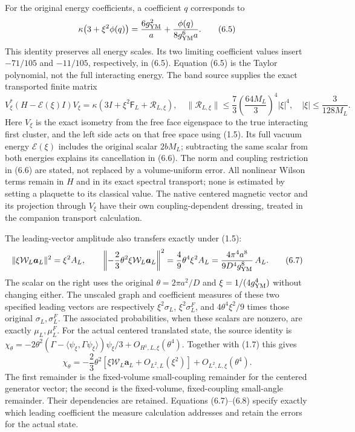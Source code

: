 \documentclass[
  11pt,
]{article}
\begin{document}
For the original energy coefficients, a coefficient \(q\) corresponds to
\[
\kappa\bigl(3+\xi^2\phi(q)\bigr)
 =\frac{6g_{\rm YM}^2}{a}
       +\frac{\phi(q)}{8g_{\rm YM}^6a}.
\tag{6.5}
\] This identity preserves all energy scales. Its two limiting
coefficient values insert \(-71/105\) and \(-11/105\), respectively, in
(6.5). Equation (6.5) is the Taylor polynomial, not the full interacting
energy. The band source supplies the exact transported finite matrix \[
V_\xi^*(H-\mathcal E(\xi)I)V_\xi
 =\kappa\left(3I+\xi^2\mathsf F_L+\mathcal R_{L,\xi}\right),
\quad
\|\mathcal R_{L,\xi}\|
 \le\frac73\left(\frac{64M_L}{3}\right)^4|\xi|^4,
\quad |\xi|\le\frac3{128M_L}.
\tag{6.6}
\] Here \(V_\xi\) is the exact isometry from the free face eigenspace to
the true interacting first cluster, and the left side acts on that free
space using (1.5). Its full vacuum energy \(\mathcal E(\xi)\) includes
the original scalar \(2bM_L\); subtracting the same scalar from both
energies explains its cancellation in (6.6). The norm and coupling
restriction in (6.6) are stated, not replaced by a volume-uniform error.
All nonlinear Wilson terms remain in \(H\) and in its exact spectral
transport; none is estimated by setting a plaquette to its classical
value. The native centered magnetic vector and its projection through
\(V_\xi\) have their own coupling-dependent dressing, treated in the
companion transport calculation.

The leading-vector amplitude also transfers exactly under (1.5): \[
\|\xi\mathcal W_L\boldsymbol a_L\|^2=\xi^2A_L,
\qquad
\left\| -\frac23\theta^2\xi\mathcal W_L\boldsymbol a_L\right\|^2
 =\frac49\theta^4\xi^2A_L
 =\frac{4\pi^4a^8}{9D^4g_{\rm YM}^8}\,A_L.
\tag{6.7}
\] The scalar on the right uses the original \(\theta=2\pi a^2/D\) and
\(\xi=1/(4g_{\rm YM}^4)\) without changing either. The unscaled graph
and coefficient measures of these two specified leading vectors are
respectively \(\xi^2\sigma_L\), \(\xi^2\sigma_L^F\), and
\(4\theta^4\xi^2/9\) times those original \(\sigma_L,\sigma_L^F\). The
associated probabilities, when these scalars are nonzero, are exactly
\(\mu_L,\mu_L^F\). For the actual centered translated state, the source
identity is \(\chi_\theta=-2\theta^2
(\Gamma-\langle\psi_\xi,\Gamma\psi_\xi\rangle)\psi_\xi/3
+O_{H^1,L,\xi}(\theta^4)\). Together with (1.7) this gives \[
\chi_\theta=-\frac23\theta^2
 [\xi\mathcal W_L\boldsymbol a_L+O_{L^2,L}(\xi^2)]
 +O_{L^2,L,\xi}(\theta^4).
\tag{6.8}
\] The first remainder is the fixed-volume small-coupling remainder for
the centered generator vector; the second is the fixed-volume,
fixed-coupling small-angle remainder. Their dependencies are retained.
Equations (6.7)--(6.8) specify exactly which leading coefficient the
measure calculation addresses and retain the errors for the actual
state.
\end{document}
